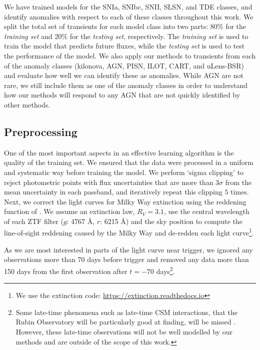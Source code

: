 \documentclass[fleqn,usenatbib]{mnras}
\begin{document}
We have trained models for the SNIa, SNIbc, SNII, SLSN, and TDE classes, and identify anomalies with respect to each of these classes throughout this work. We split the total set of transients for each model class into two parts: 80\% for the \textit{training set} and 20\% for the \textit{testing set}, respectively. The \textit{training set} is used to train the model that predicts future fluxes, while the \textit{testing set} is used to test the performance of the model. We also apply our methods to transients from each of the anomaly classes (kilonova, AGN, PISN, ILOT, CART, and uLens-BSR) and evaluate how well we can identify these as anomalies. While AGN are not rare, we still include them as one of the anomaly classes in order to understand how our methods will respond to any AGN that are not quickly identified by other methods.


\subsection{Preprocessing}
\label{sec:preprocessing}
One of the most important aspects in an effective learning algorithm is the quality of the training set. We ensured that the data were processed in a uniform and systematic way before training the model. We perform `sigma clipping' to reject photometric points with flux uncertainties that are more than $3\sigma$ from the mean uncertainty in each passband, and iteratively repeat this clipping $5$ times. Next, we correct the light curves for Milky Way extinction using the reddening function of \citet{Fitzpatrick1998}. We assume an extinction law, $R_V = 3.1$, use the central wavelength of each ZTF filter ($g$: 4767 \AA,  $r$: 6215 \AA) and the sky position to compute the line-of-sight reddening caused by the Milky Way and de-redden each light curve\footnote{We use the extinction code: \url{https://extinction.readthedocs.io}}.

As we are most interested in parts of the light curve near trigger, we ignored any observations more than 70 days before trigger and removed any data more than 150 days from the first observation after $t=-70$ days\footnote{Some late-time phenomena such as late-time CSM interactions, that the Rubin Observatory will be particularly good at finding, will be missed \citep[e.g.][]{Soderberg2005GCN,Graham2019LateTimeCSM}. However, these late-time observations will not be well modelled by our methods and are outside of the scope of this work.}.
\end{document}
